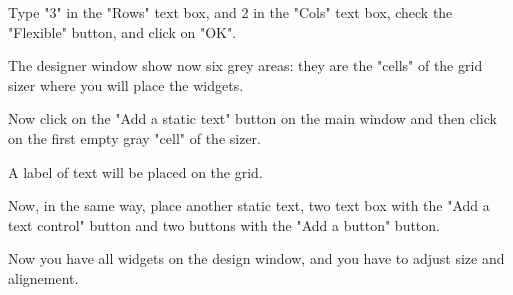 \documentclass[a4paper,10pt]{book}
\begin{document}
                                                    
                                                    Type "3" in the "Rows" text box, and 2 in the "Cols" text box,
                                                     check the "Flexible" button, and click on "OK".
                                                    
                                                    
                                                    
                                                    
                                                    The designer window show now six grey areas: they are the "cells"
                                                     of the grid sizer where you will place the widgets.
                                                    
                                                    
                                                    
                                                    
                                                    Now click on the "Add a static text" button on the main window
                                                     and then click on the first empty gray "cell" of the sizer.
                                                    
                                                    
                                                    
                                                    
                                                    A label of text will be placed on the grid.
                                                    
                                                    
                                                    
                                                    
                                                    Now, in the same way, place another static text, two text box
                                                     with the "Add a text control" button and two buttons with the
                                                     "Add a button" button.
                                                    
                                                    
                                                    
                                                    
                                                    Now you have all widgets on the design window, and you have to
                                                     adjust size and alignement.
                                                    
\end{document}
